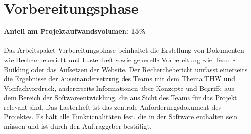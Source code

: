 \section{Vorbereitungsphase}
\textbf{Anteil am Projektaufwandsvolumen: 15\%}\\ \\
Das Arbeitspaket Vorbereitungsphase beinhaltet die Erstellung von Dokumenten 
wie Recherchebericht und Lastenheft sowie generelle Vorbereitung wie Team
-Building oder das Aufsetzen der Website.
Der Recherchebericht umfasst einerseits die Ergebnisse der Auseinandersetzung 
des Teams mit dem Thema THW und Vierfachvordruck, andererseits Informationen 
über Konzepte und Begriffe aus dem Bereich der Softwareentwicklung, die aus 
Sicht des Teams für das Projekt relevant sind.
Das Lastenheft ist das zentrale Anforderungsdokument des Projektes. Es hält 
alle Funktionalitäten fest, die in der Software enthalten sein müssen und 
ist durch den Auftraggeber bestätigt.

